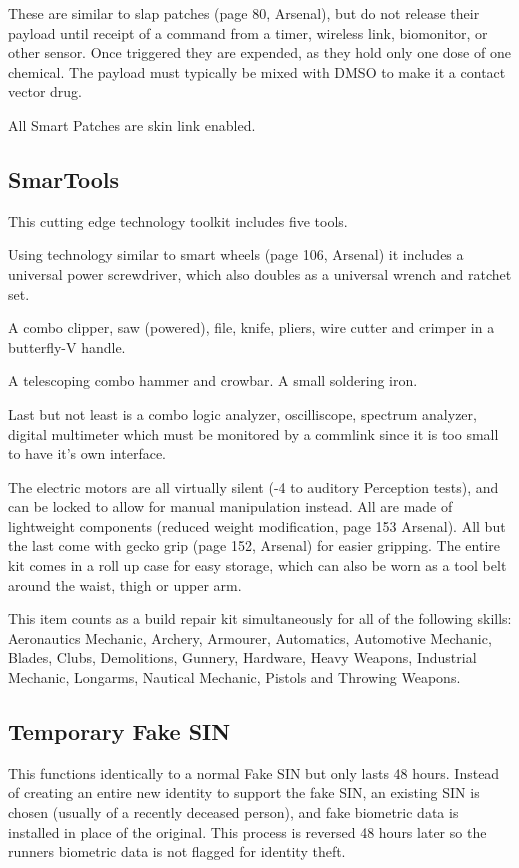 \documentclass{article}
\begin{document}
  These are similar to slap patches (page 80, Arsenal), but do not release their payload until receipt of a command from a timer, wireless link, biomonitor, or other sensor.  Once triggered they are expended, as they hold only one dose of one chemical.  The payload must typically be mixed with DMSO to make it a contact vector drug.

  All Smart Patches are skin link enabled.

\subsection*{SmarTools}

  This cutting edge technology toolkit includes five tools.

  Using technology similar to smart wheels (page 106, Arsenal) it includes a universal power screwdriver, which also doubles as a universal wrench and ratchet set.
  
  A combo clipper, saw (powered), file, knife, pliers, wire cutter and crimper in a butterfly-V handle.
  
  A telescoping combo hammer and crowbar.  A small soldering iron.  
  
  Last but not least is a combo logic analyzer, oscilliscope, spectrum analyzer, digital multimeter which must be monitored by a commlink since it is too small to have it's own interface.

  The electric motors are all virtually silent (-4 to auditory Perception tests), and can be locked to allow for manual manipulation instead.  All are made of lightweight components (reduced weight modification, page 153 Arsenal).  All but the last come with gecko grip (page 152, Arsenal) for easier gripping.  The entire kit comes in a roll up case for easy storage, which can also be worn as a tool belt around the waist, thigh or upper arm.

  This item counts as a build repair kit simultaneously for all of the following skills:  Aeronautics Mechanic, Archery, Armourer, Automatics, Automotive Mechanic, Blades, Clubs, Demolitions, Gunnery, Hardware, Heavy Weapons, Industrial Mechanic, Longarms, Nautical Mechanic, Pistols and Throwing Weapons.

\subsection*{Temporary Fake SIN}

This functions identically to a normal Fake SIN but only lasts 48 hours.  Instead of creating an entire new identity to support the fake SIN, an existing SIN is chosen (usually of a recently deceased person), and fake biometric data is installed in place of the original.  This process is reversed 48 hours later so the runners biometric data is not flagged for identity theft.
\end{document}
